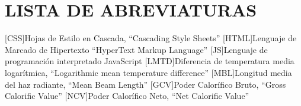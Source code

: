 \chapter*{LISTA DE ABREVIATURAS}

\begin{acronym}

[CSS]{Hojas de Estilo en Cascada, ``Cascading Style Sheets''}
[HTML]{Lenguaje de Marcado de Hipertexto ``HyperText Markup Language''}
[JS]{Lenguaje de programación interpretado JavaScript}
[LMTD]{Diferencia de temperatura media logarítmica, ``Logarithmic mean temperature difference''}
[MBL]{Longitud media del haz radiante, ``Mean Beam Length''}
[GCV]{Poder Calorífico Bruto, ``Gross Calorific Value''}
[NCV]{Poder Calorífico Neto, ``Net Calorific Value''}

\end{acronym}
\clearpage